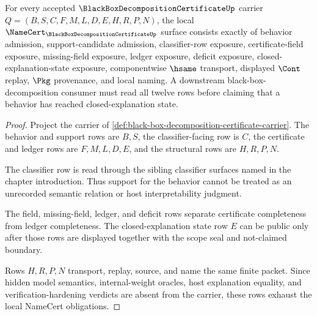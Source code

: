 \begin{theorem}
\label{thm:black-box-decomposition-certificate-namecert-obligations}
For every accepted $\BlackBoxDecompositionCertificateUp$ carrier $Q=(B,S,C,F,M,L,D,E,H,R,P,N)$, the local $\NameCert_{\BlackBoxDecompositionCertificateUp}$ surface consists exactly of behavior admission, support-candidate admission, classifier-row exposure, certificate-field exposure, missing-field exposure, ledger exposure, deficit exposure, closed-explanation-state exposure, componentwise $\hsame$ transport, displayed $\Cont$ replay, $\Pkg$ provenance, and local naming. A downstream black-box-decomposition consumer must read all twelve rows before claiming that a behavior has reached closed-explanation state.
\end{theorem}
\begin{proof}
Project the carrier of \autoref{def:black-box-decomposition-certificate-carrier}. The behavior and support rows are $B,S$, the classifier-facing row is $C$, the certificate and ledger rows are $F,M,L,D,E$, and the structural rows are $H,R,P,N$.

The classifier row is read through the sibling classifier surfaces named in the chapter introduction. Thus support for the behavior cannot be treated as an unrecorded semantic relation or host interpretability judgment.

The field, missing-field, ledger, and deficit rows separate certificate completeness from ledger completeness. The closed-explanation state row $E$ can be public only after those rows are displayed together with the scope seal and not-claimed boundary.

Rows $H,R,P,N$ transport, replay, source, and name the same finite packet. Since hidden model semantics, internal-weight oracles, host explanation equality, and verification-hardening verdicts are absent from the carrier, these rows exhaust the local NameCert obligations.
\end{proof}

